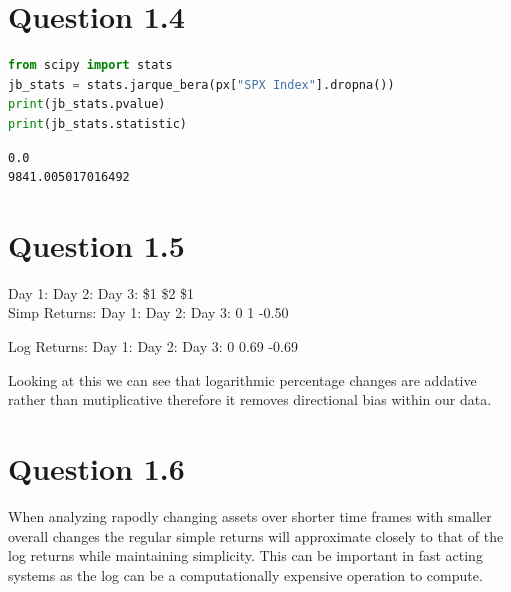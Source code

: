 \hypertarget{question-1.4}{%
\section{Question 1.4}\label{question-1.4}}

\begin{lstlisting}[language=Python]
from scipy import stats
jb_stats = stats.jarque_bera(px["SPX Index"].dropna())
print(jb_stats.pvalue)
print(jb_stats.statistic)
\end{lstlisting}

\begin{lstlisting}
0.0
9841.005017016492
\end{lstlisting}

\hypertarget{question-1.5}{%
\section{Question 1.5}\label{question-1.5}}

Day 1: Day 2: Day 3: \$1 \$2 \$1\\
Simp Returns: Day 1: Day 2: Day 3: 0 1 -0.50

Log Returns: Day 1: Day 2: Day 3: 0 0.69 -0.69

Looking at this we can see that logarithmic percentage changes are
addative rather than mutiplicative therefore it removes directional bias
within our data.

\hypertarget{question-1.6}{%
\section{Question 1.6}\label{question-1.6}}

When analyzing rapodly changing assets over shorter time frames with
smaller overall changes the regular simple returns will approximate
closely to that of the log returns while maintaining simplicity. This
can be important in fast acting systems as the log can be a
computationally expensive operation to compute.
